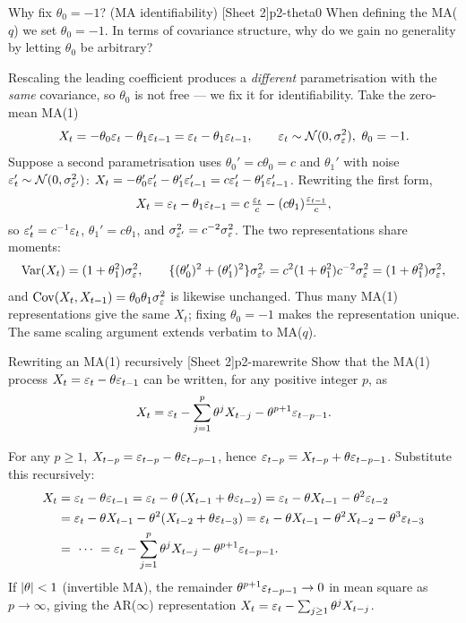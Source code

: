 \begin{exercise}{Why fix $\theta_0=-1$? (MA identifiability) \quad\textnormal{[Sheet 2]}}{p2-theta0}
When defining the MA($q$) we set $\theta_0=-1$. In terms of covariance
structure, why do we gain no generality by letting $\theta_0$ be arbitrary?
\end{exercise}
\begin{solution}
Rescaling the leading coefficient produces a \emph{different} parametrisation
with the \emph{same} covariance, so $\theta_0$ is not free --- we fix it for
identifiability. Take the zero-mean MA(1)
\[
X_t=-\theta_0\varepsilon_t-\theta_1\varepsilon_{t-1}=\varepsilon_t-\theta_1\varepsilon_{t-1},
\qquad \varepsilon_t\sim\mathcal N(0,\sigma_\varepsilon^2),\ \theta_0=-1 .
\]
Suppose a second parametrisation uses $\theta_0'=c\theta_0=c$ and $\theta_1'$
with noise $\varepsilon_t'\sim\mathcal N(0,\sigma_{\varepsilon'}^2)$:
$X_t=-\theta_0'\varepsilon_t'-\theta_1'\varepsilon_{t-1}'=c\varepsilon_t'-\theta_1'\varepsilon_{t-1}'$.
Rewriting the first form,
\[
X_t=\varepsilon_t-\theta_1\varepsilon_{t-1}
=c\,\tfrac{\varepsilon_t}{c}-(c\theta_1)\tfrac{\varepsilon_{t-1}}{c},
\]
so $\varepsilon_t'=c^{-1}\varepsilon_t$, $\theta_1'=c\theta_1$, and
$\sigma_{\varepsilon'}^2=c^{-2}\sigma_\varepsilon^2$. The two representations share moments:
\[
\operatorname{Var}(X_t)=(1+\theta_1^2)\sigma_\varepsilon^2,
\qquad
\{(\theta_0')^2+(\theta_1')^2\}\sigma_{\varepsilon'}^2
=c^2(1+\theta_1^2)c^{-2}\sigma_\varepsilon^2=(1+\theta_1^2)\sigma_\varepsilon^2,
\]
and $\operatorname{Cov}(X_t,X_{t-1})=\theta_0\theta_1\sigma_\varepsilon^2$ is likewise unchanged.
Thus many MA(1) representations give the same $X_t$; fixing $\theta_0=-1$ makes
the representation unique. The same scaling argument extends verbatim to
MA($q$).
\end{solution}

\begin{exercise}{Rewriting an MA(1) recursively \quad\textnormal{[Sheet 2]}}{p2-marewrite}
Show that the MA(1) process $X_t=\varepsilon_t-\theta\varepsilon_{t-1}$ can be written, for any
positive integer $p$, as
\[
X_t=\varepsilon_t-\sum_{j=1}^{p}\theta^{j}X_{t-j}-\theta^{p+1}\varepsilon_{t-p-1}.
\]
\end{exercise}
\begin{solution}
For any $p\ge1$, $X_{t-p}=\varepsilon_{t-p}-\theta\varepsilon_{t-p-1}$, hence
$\varepsilon_{t-p}=X_{t-p}+\theta\varepsilon_{t-p-1}$. Substitute this recursively:
\[
\begin{aligned}
X_t&=\eps_t-\theta\eps_{t-1}
   =\eps_t-\theta\,(X_{t-1}+\theta\eps_{t-2})
   =\eps_t-\theta X_{t-1}-\theta^2\eps_{t-2}\\
   &=\eps_t-\theta X_{t-1}-\theta^2(X_{t-2}+\theta\eps_{t-3})
   =\eps_t-\theta X_{t-1}-\theta^2 X_{t-2}-\theta^3\eps_{t-3}\\
   &=\ \cdots\ =\eps_t-\sum_{j=1}^{p}\theta^{j}X_{t-j}-\theta^{p+1}\eps_{t-p-1}.
\end{aligned}
\]
If $\left\lvert \theta \right\rvert<1$ (invertible MA), the remainder $\theta^{p+1}\varepsilon_{t-p-1}\to0$
in mean square as $p\to\infty$, giving the AR($\infty$) representation
$X_t=\varepsilon_t-\sum_{j\ge1}\theta^j X_{t-j}$.
\end{solution}

